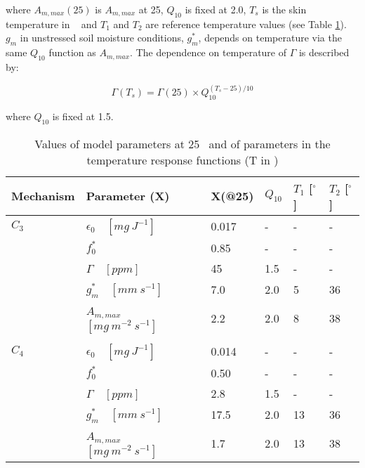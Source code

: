 {where $A_{m,max}(25)$ is $A_{m,max}$ at 25\textcelsius, $Q_{10}$ is fixed at 2.0, $T_{s}$ is the skin temperature in \textcelsius ~ and $T_{1}$ and $T_{2}$
are reference temperature values (see Table \ref{tab3}). $g_{m}$ in unstressed soil moisture conditions, $g_{m}^{*}$,
depends on temperature via the same $Q_{10}$ function as $A_{m,max}$. The dependence on temperature of $\Gamma$ is
described by:

\begin{equation}
\Gamma(T_{s}) = \Gamma(25) \times Q_{10}^{(T_{s}-25)/10}
\end{equation}

where $Q_{10}$ is fixed at 1.5.
\clearpage

\begin{table}
\caption{Values of model parameters at 25\textcelsius ~ and of parameters in the temperature response
functions (T in \textcelsius)}
			\begin{center}
			\begin{tabular}{llllll}\label{tab3} \\
\hline
			Mechanism & Parameter (X) & X(@25) & $Q_{10}$ & $T_{1}$ [$^{\circ}$] & $T_{2}$ [$^{\circ}$] \\
\hline
$C_{3}$ &  ${\epsilon}_{0}$~~$[mg~J^{-1}]$     & 0.017 & -   & - & - \\
        &  $f_{0}^{*}$                         & 0.85  & -   & - & - \\
        &  $\Gamma$~~$[ppm]$                   & 45    & 1.5 & - & - \\
        &  $g_{m}^{*}$~~$[mm~s^{-1}]$          & 7.0   & 2.0 & 5 & 36\footnotemark \\
        &  $A_{m,max}$~~$[mg~m^{-2}~s^{-1}]$   & 2.2   & 2.0 & 8 & 38 \\ \\

$C_{4}$ &  ${\epsilon}_{0}$~~$[mg~J^{-1}]$     & 0.014 & -   & -  & - \\
        &  $f_{0}^{*}$                         & 0.50  & -   & -  & - \\
        &  $\Gamma$~~$[ppm]$                   & 2.8   & 1.5 & -  & - \\
        &  $g_{m}^{*}$~~$[mm~s^{-1}]$          & 17.5  & 2.0 & 13 & 36 \\
        &  $A_{m,max}$~~$[mg~m^{-2}~s^{-1}]$   & 1.7   & 2.0 & 13 & 38 \\
\hline
			\end{tabular}
			\end{center}
\end{table}

}
